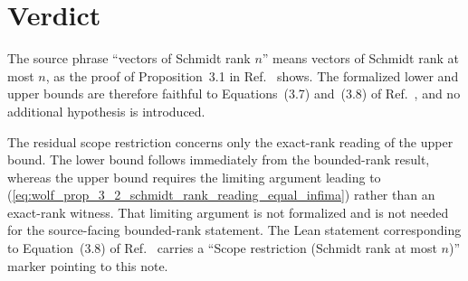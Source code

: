 \documentclass[11pt]{article}
\begin{document}
\section{Verdict}

The source phrase ``vectors of Schmidt rank $n$'' means vectors of Schmidt rank
at most $n$, as the proof of Proposition~3.1 in
Ref.~\cite{Wolf2012Quantum} shows. The formalized lower and upper bounds are
therefore faithful to Equations~(3.7) and~(3.8) of
Ref.~\cite{Wolf2012Quantum}, and no additional hypothesis is introduced.

The residual scope restriction concerns only the exact-rank reading of the
upper bound. The lower bound follows immediately from the bounded-rank result,
whereas the upper bound requires the limiting argument leading to
(\ref{eq:wolf_prop_3_2_schmidt_rank_reading_equal_infima}) rather than an
exact-rank witness. That limiting argument is not formalized and is not needed
for the source-facing bounded-rank statement. The Lean statement corresponding
to Equation~(3.8) of Ref.~\cite{Wolf2012Quantum} carries a
``Scope restriction (Schmidt rank at most $n$)'' marker pointing to this note.



\end{document}
